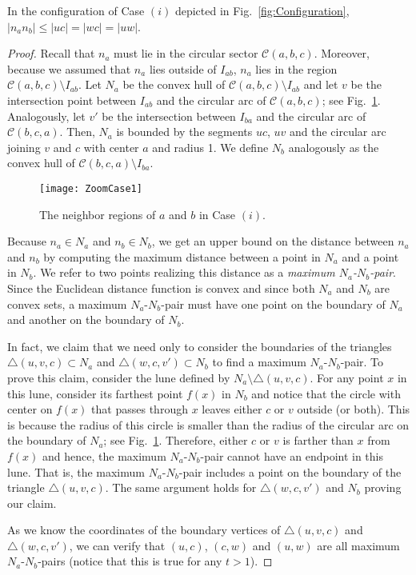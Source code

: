 \documentclass{cccg14}
\begin{document}
\vspace{-0.5em}
\begin{lemma}\label{lemma:Case one maximized length}
In the configuration of Case $(i)$ depicted in Fig.~\ref{fig:Configuration},
$|n_an_b| \leq |uc| = |wc| = |uw|$.
\end{lemma}
\vspace{-1em}
\begin{proof}
Recall that $n_a$ must lie in the circular sector $\mathcal C(a,b,c)$. Moreover,
because we assumed that $n_a$ lies outside of $I_{ab}$, $n_a$ lies in the region $\mathcal C(a, b,c) \setminus I_{ab}$. 
Let $N_a$ be the convex hull of $\mathcal C(a, b,c) \setminus I_{ab}$ and let $v$ be the intersection point between $I_{ab}$ and the circular arc of $\mathcal C(a, b, c)$; see Fig.~\ref{fig:Neighbor regions Case 1}. Analogously, let $v'$ be the intersection between $I_{ba}$ and the circular arc of $\mathcal C(b,c,a)$.
Then, $N_a$ is bounded by the segments $uc$, $uv$ and the circular arc joining $v$ and $c$ with center $a$ and radius 1. We define $N_b$ analogously as the convex hull of $\mathcal C(b, c, a)\setminus I_{ba}$.

\begin{figure}[htb]
\centering
\texttt{[image: ZoomCase1]}
\caption{\small The neighbor regions of $a$ and $b$ in Case $(i)$.}
\label{fig:Neighbor regions Case 1}
\vspace{-.1in}
\end{figure}

Because $n_a\in N_a$ and $n_b\in N_b$, we get an upper bound on the distance between $n_a$ and $n_b$ by computing the maximum distance between a point in $N_a$ and a point in $N_b$. We refer to two points realizing this distance as a  \emph{maximum $N_a$-$N_b$-pair}.
Since the Euclidean distance function is convex and since both $N_a$ and $N_b$ are convex sets, a maximum $N_a$-$N_b$-pair must have one point on the boundary of $N_a$ and another on the boundary of $N_b$.

In fact, we claim that we need only to consider the boundaries of the triangles $\triangle(u,v,c)\subset N_a$ and $\triangle(w, c, v')\subset N_b$ to find a maximum $N_a$-$N_b$-pair.
To prove this claim, consider the lune defined by $N_a\setminus \triangle(u,v,c)$. For any point $x$ in this lune, consider its farthest point $f(x)$ in $N_b$ and notice that the circle with center on $f(x)$ that passes through $x$ leaves either $c$ or $v$ outside (or both). This is because the radius of this circle is smaller than the radius of the circular arc on the boundary of $N_a$; see Fig.~\ref{fig:Neighbor regions Case 1}. Therefore, either $c$ or $v$ is farther than $x$ from $f(x)$ and hence, the maximum $N_a$-$N_b$-pair cannot have an endpoint in this lune. That is, the maximum $N_a$-$N_b$-pair includes a point on the boundary of the triangle $\triangle(u,v,c)$. The same argument holds for $\triangle(w, c, v')$ and $N_b$ proving our claim.

As we know the coordinates of the boundary vertices of $\triangle(u,v,c)$ and $\triangle(w, c, v')$, we can verify that 
$(u,c)$, $(c, w)$ and $(u, w)$ are all 
maximum $N_a$-$N_b$-pairs (notice that this is true for any $t > 1$).
\end{proof}
\end{document}
